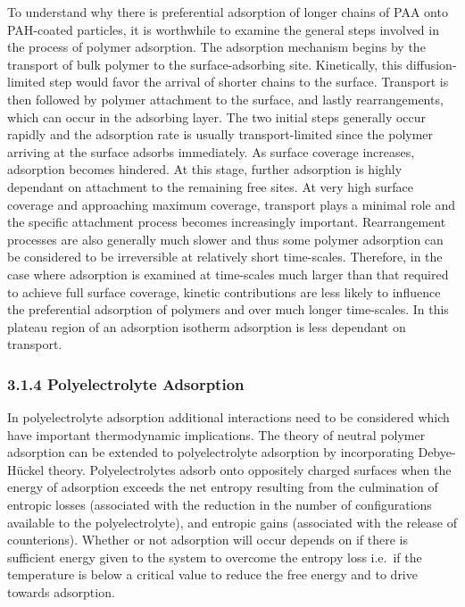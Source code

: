 \documentclass[journal=mamobx,manuscript=article]{achemso}
\begin{document}
To understand why there is preferential adsorption of longer chains of PAA onto PAH-coated particles, it is worthwhile to examine the general steps involved in the process of polymer adsorption.  The adsorption mechanism begins by the transport of bulk polymer to the surface-adsorbing site.  Kinetically, this diffusion-limited step would favor the arrival of shorter chains to the surface.  Transport is then followed by polymer attachment to the surface, and lastly rearrangements, which can occur in the adsorbing layer.  The two initial steps generally occur rapidly and the adsorption rate is usually transport-limited since the polymer arriving at the surface adsorbs immediately.\cite{Dijt1990} As surface coverage increases, adsorption becomes hindered.  At this stage, further adsorption is highly dependant on attachment to the remaining free sites.\cite{Hoogeveen1996}  At very high surface coverage and approaching maximum coverage, transport plays a minimal role and the specific attachment process becomes increasingly important.\cite{Hoogeveen1996} Rearrangement processes are also generally much slower and thus some polymer adsorption can be considered to be irreversible at relatively short time-scales.\cite{Cafe1982,Meadows1988}  Therefore, in the case where adsorption is examined at time-scales much larger than that required to achieve full surface coverage, kinetic contributions are less likely to influence the preferential adsorption of polymers and over much longer time-scales.  In this plateau region of an adsorption isotherm adsorption is less dependant on transport.\cite{Hoogeveen1996}



\subsubsection{3.1.4 Polyelectrolyte Adsorption}  %
    \label{sec-polyads}

In polyelectrolyte adsorption additional interactions need to be considered which have important thermodynamic implications. The theory of neutral polymer adsorption can be extended to polyelectrolyte adsorption by incorporating Debye-H\"uckel theory.\cite{Chatellier1996}  Polyelectrolytes adsorb onto oppositely charged surfaces when the energy of adsorption exceeds the net entropy resulting from the culmination of entropic losses (associated with the reduction in the number of configurations available to the polyelectrolyte), and entropic gains (associated with the release of counterions).  Whether or not adsorption will occur depends on if there is sufficient energy given to the system to overcome the entropy loss i.e.\ if the temperature is below a critical value to reduce the free energy and to drive towards adsorption.
\end{document}
